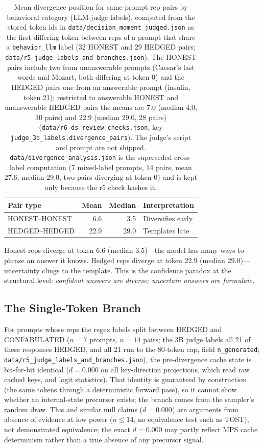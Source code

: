 \documentclass[11pt,a4paper]{article}
\begin{document}
\begin{table}[H]
\centering
\caption{Mean divergence position for same-prompt rep pairs by
behavioral category (LLM-judge labels), computed from the stored token ids in \texttt{data/decision\_moment\_judged.json} as the first differing token between reps of a prompt that share a \texttt{behavior\_llm} label (32 HONEST and 29 HEDGED pairs; \texttt{data/r5\_judge\_labels\_and\_branches.json}). The HONEST pairs include two from unanswerable prompts (Caesar's last words and Mozart, both differing at token 0) and the HEDGED pairs one from an answerable prompt (insulin, token 21); restricted to answerable HONEST and unanswerable HEDGED pairs the means are 7.0 (median 4.0, 30 pairs) and 22.9 (median 29.0, 28 pairs) (\texttt{data/\allowbreak r6\_\allowbreak ds\_\allowbreak review\_\allowbreak checks.json}, key \texttt{judge\_3b\_labels.\allowbreak divergence\_pairs}). The judge's script and prompt are not shipped. \texttt{data/divergence\_analysis.json} is the superseded cross-label computation (7 mixed-label prompts, 14 pairs, mean 27.6, median 29.0, two pairs diverging at token 0) and is kept only because the r5 check hashes it.}
\label{tab:divergence}
\begin{tabular}{lrrl}
\toprule
Pair type & Mean & Median & Interpretation \\
\midrule
HONEST--HONEST & 6.6 & 3.5 & Diversifies early \\
HEDGED--HEDGED & 22.9 & 29.0 & Templates late \\
\bottomrule
\end{tabular}
\end{table}

Honest reps diverge at token $6.6$ (median $3.5$)---the model has many
ways to phrase an answer it knows. Hedged reps diverge at token $22.9$
(median $29.0$)---uncertainty clings to the template. This is the
confidence paradox at the structural level: \emph{confident answers are
diverse; uncertain answers are formulaic.}

\subsection{The Single-Token Branch}

For prompts whose reps the regex labels split between HEDGED and CONFABULATED ($n{=}7$
prompts, $n{=}14$ pairs; the 3B judge labels all 21 of these responses HEDGED, and all 21 run to the 80-token cap, field \texttt{n\_generated}; \texttt{data/r5\_judge\_labels\_and\_branches.json}), the pre-divergence cache state is bit-for-bit
identical ($d{=}0.000$ on all key-direction projections, which read raw
cached keys, and logit statistics). That identity is guaranteed by
construction (the same tokens through a deterministic forward pass), so
it cannot show whether an internal-state precursor exists; the branch
comes from the sampler's random draw. This and similar
null claims ($d{=}0.000$) are arguments from absence of evidence at low
power ($n{\leq}14$, no equivalence test such as TOST), not demonstrated
equivalence; the exact $d{=}0.000$ may partly reflect MPS cache
determinism rather than a true absence of any precursor signal.
\end{document}
